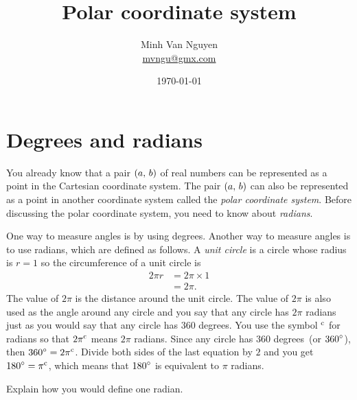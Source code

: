 \documentclass[a4paper,oneside,12pt]{article}
\begin{document}
\title{\Large\bf Polar coordinate system}
\author{%
  Minh Van Nguyen \\
  \url{mvngu@gmx.com}
}
\date{\today}
\maketitle



\section{Degrees and radians}

You already know that a pair $\tuple{a}{b}$ of real numbers can be
represented as a point in the Cartesian coordinate system.  The pair
$\tuple{a}{b}$ can also be represented as a point in another
coordinate system called the \emph{polar coordinate system}.  Before
discussing the polar coordinate system, you need to know about
\emph{radians}.

One way to measure angles is by using degrees.  Another way to measure
angles is to use radians, which are defined as follows.  A
\emph{unit circle} is a circle whose radius is $r = 1$ so the
circumference of a unit circle is
\begin{align*}
2 \pi r
&=
2 \pi \times 1 \\[4pt]
&=
2 \pi.
\end{align*}
The value of $2 \pi$ is the distance around the unit circle.  The
value of $2 \pi$ is also used as the angle around any circle and you
say that any circle has $2 \pi$ radians just as you would say that any
circle has $360$ degrees.  You use the symbol $\radian{}$ for radians
so that $\radian{2\pi}$ means $2\pi$ radians.  Since any circle has
$360$ degrees~(or $\degree{360}$), then
$\degree{360} = \radian{2\pi}$.  Divide both sides of the last
equation by $2$ and you get $\degree{180} = \radian{\pi}$, which means
that $\degree{180}$ is equivalent to $\pi$ radians.

\begin{exercise}
Explain how you would define one radian.
\end{exercise}

\end{document}
